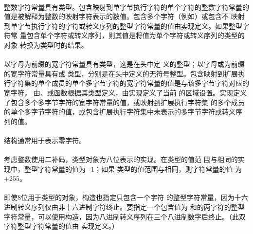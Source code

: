 {\semantic
\paragraph{}
整数字符常量具有类型。包含映射到单字节执行字符的单个字符的整数字符常量的
值是被解释为整数的映射字符表示的数值。包含多个字符（例如）或包含不
映射到单字节执行字符的字符或转义序列的整型字符常量的值由实现定义。如果整型字符常
量包含单个字符或转义序列，则其值是将值为单个字符或转义序列的类型的对象
转换为类型时的结果。

\paragraph{}
以字母为前缀的宽字符常量具有类型，这是在头中定
义的整型；以字母或为前缀的宽字符常量具有或
类型，分别是在头中定义的无符号整型。包含映射到扩展执
行字符集的单个成员的单个多字节字符的宽字符常量的值是与该多字节字符对应的宽字符，
由、或函数根据其类型定义，由实现定义了当前
的区域设置。实现定义了包含多个多字节字符的宽字符常量的值，或映射到扩展执行字符集
的多个成员的单个多字节字符的值，或包含扩展执行字符集中未表示的多字节字符或转义序
列的值。

\paragraph{}
\ex 结构\tm{\sq\bs 0\sq}通常用于表示零字符。

\paragraph{}
\ex 考虑整数使用二补码，类型对象为八位表示的实现。在类型的值范
围与相同的实现中，整型字符常量的值为$-1$；如果
类型的值范围与相同，则字符常量的值
为$+255$。

\paragraph{}
\ex 即使8位用于类型的对象，构造也指定只包含一个字符
的整型字符常量，因为十六进制转义序列仅由非十六进制字符终止。要指定一个包含值为
和的两字符的整型字符常量，可以使用构造\tm{\sq\b
0223\sq}，因为八进制转义序列在三个八进制数字后终止。（此双字符整型字符常量的值由
实现定义。）

}
